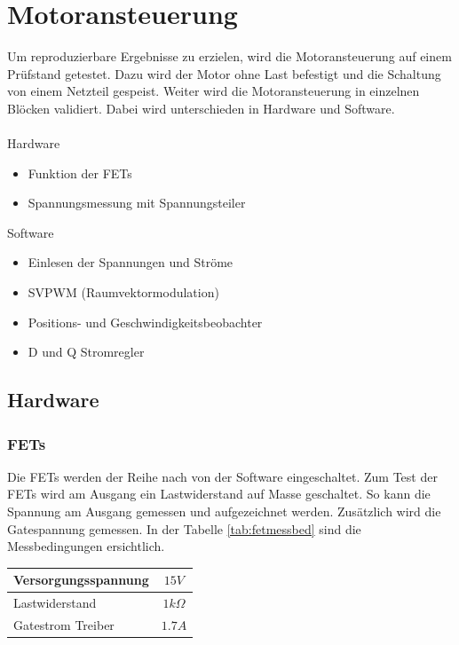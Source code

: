 \section{Motoransteuerung} \label{ValidMotoransteuerung}
Um reproduzierbare Ergebnisse zu erzielen, wird die Motoransteuerung auf einem Prüfstand getestet. Dazu wird der Motor ohne Last befestigt und die Schaltung von einem Netzteil gespeist. Weiter wird die Motoransteuerung in einzelnen Blöcken validiert. Dabei wird unterschieden in Hardware und Software.\\
\\
Hardware
\begin{itemize}
	\item Funktion der FETs
	\item Spannungsmessung mit Spannungsteiler
\end{itemize}
Software
\begin{itemize}
	\item Einlesen der Spannungen und Ströme
	\item SVPWM (Raumvektormodulation)
	\item Positions- und Geschwindigkeitsbeobachter
	\item D und Q Stromregler
\end{itemize}

\subsection{Hardware}
\subsubsection*{FETs}
Die FETs werden der Reihe nach von der Software eingeschaltet. Zum Test der FETs wird am Ausgang ein Lastwiderstand auf Masse geschaltet. So kann die Spannung am Ausgang gemessen und aufgezeichnet werden. Zusätzlich wird die Gatespannung gemessen. In der Tabelle \ref{tab:fetmessbed} sind die Messbedingungen ersichtlich.

\begin{center}
	\begin{tabular}{l|c}
		\hline 
		Versorgungsspannung & $15V$ \\ \hline
		Lastwiderstand & $1k\Omega$ \\ \hline
		Gatestrom Treiber & $1.7A$ \\ \hline
	\end{tabular} 
	\label{tab:fetmessbed}
\end{center}

